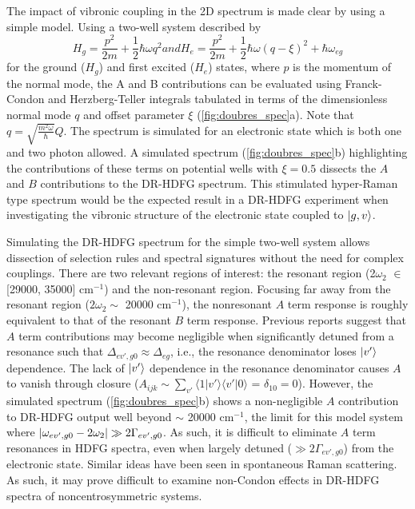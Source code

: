 \documentclass[aip, jcp, reprint, onecolumn]{revtex4-2}
\begin{document}
The impact of vibronic coupling in the 2D spectrum is made clear by using a simple model. \cite{Kundu2022}
Using a two-well system described by 
\begin{subequations}
	\begin{equation}
		H_g = \frac{p^2}{2m} + \frac{1}{2} \hbar \omega q^2
	\end{equation}
and
	\begin{equation}
		H_e = \frac{p^2}{2m} + \frac{1}{2} \hbar \omega (q-\xi)^2 +\hbar \omega_{eg}
	\end{equation}
\end{subequations}
for the ground ($H_g$) and first excited ($H_e$) states, where $p$ is the momentum of the normal mode, the A and B contributions can be evaluated using Franck-Condon and Herzberg-Teller integrals tabulated in terms of the dimensionless normal mode $q$ and offset parameter $\xi$ (\autoref{fig:doubres_spec}a). \cite{Carlson1988thesis} 
Note that $q = \sqrt{\frac{m^2\omega}{\hbar}} Q$.
The spectrum is simulated for an electronic state which is both one and two photon allowed.
A simulated spectrum   (\autoref{fig:doubres_spec}b) highlighting the contributions of these terms on potential wells with $\xi = 0.5$ dissects the $A$ and $B$ contributions to the DR-HDFG spectrum.
This stimulated hyper-Raman type spectrum would be the expected result in a DR-HDFG experiment when investigating the vibronic structure of the electronic state coupled to $\ket{g,v}$.

Simulating the DR-HDFG spectrum for the simple two-well system allows dissection of selection rules and spectral signatures without the need for complex couplings.
There are two relevant regions of interest: the resonant region (2$\omega_2$ $\in$ [29000, 35000] cm$^{-1}$) and the non-resonant region.
Focusing far away from the resonant region ($2\omega_2 \sim$ 20000 cm$^{-1}$), the nonresonant $A$ term response is roughly equivalent to that of the resonant $B$ term response. 
Previous reports suggest that $A$ term contributions may become negligible when significantly detuned from a resonance such that $\Delta_{ev', g0} \approx \Delta_{eg}$, i.e., the resonance denominator loses $\ket{v'}$ dependence. \cite{Neddersen1989}
The lack of $\ket{v'}$ dependence in the resonance denominator causes $A$ to vanish through closure ($A_{ijk} \sim \sum_{v'} \langle 1|v' \rangle \langle v'|0\rangle$ = $\delta_{10} = 0$).
However, the simulated spectrum (\autoref{fig:doubres_spec}b) shows a non-negligible $A$ contribution to DR-HDFG output well beyond $\sim$ 20000 cm$^{-1}$, the limit for this model system where $\abs{\omega_{ev',g0} - 2\omega_2} \gg 2\Gamma_{ev',g0}$.
As such, it is difficult to eliminate $A$ term resonances in HDFG spectra, even when largely detuned ($\gg 2\Gamma_{ev',g0}$) from the electronic state. 
Similar ideas have been seen in spontaneous Raman scattering. \cite{Li1990, Gong2015}
As such, it may prove difficult to examine non-Condon effects in DR-HDFG spectra of noncentrosymmetric systems. 
\end{document}
